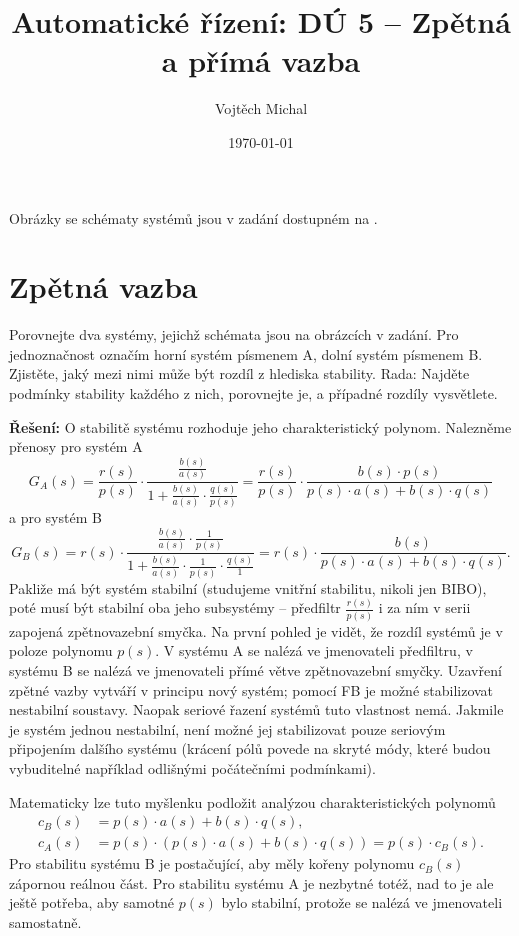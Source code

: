\documentclass[twoside]{article}
\title{Automatické řízení: DÚ 5 -- Zpětná a přímá vazba}
\author{Vojtěch Michal}
\date{\today}
\begin{document}
\maketitle

Obrázky se schématy systémů jsou v zadání dostupném na \cite{zadani}.

\section{Zpětná vazba}
Porovnejte dva systémy, jejichž schémata jsou na obrázcích v zadání.
Pro jednoznačnost označím horní systém písmenem A, dolní systém písmenem B.
Zjistěte, jaký mezi nimi může být rozdíl z hlediska stability. Rada: Najděte podmínky stability každého
z nich, porovnejte je, a případné rozdíly vysvětlete.

\textbf{Řešení:}
O stabilitě systému rozhoduje jeho charakteristický polynom. Nalezněme přenosy pro systém A
\begin{equation}
	G_A(s) = \frac{r(s)}{p(s)} \cdot \frac{\frac{b(s)}{a(s)} }{1 + \frac{b(s)}{a(s)} \cdot \frac{q(s)}{p(s)}} =
	\frac{r(s)}{p(s)} \cdot \frac{b(s) \cdot p(s)}{p(s) \cdot a(s) + b(s) \cdot q(s)}
\end{equation}
a pro systém B
\begin{equation}
	G_B(s) = r(s) \cdot \frac{\frac{b(s)}{a(s)} \cdot \frac{1}{p(s)}}{1 + \frac{b(s)}{a(s)} \cdot \frac{1}{p(s)} \cdot \frac{q(s)}{1}} =
	r(s) \cdot \frac{b(s) }{p(s) \cdot a(s) + b(s) \cdot q(s)}.
\end{equation}
Pakliže má být systém stabilní (studujeme vnitřní stabilitu, nikoli jen BIBO), poté musí být stabilní oba jeho subsystémy -- předfiltr
$\frac{r(s)}{p(s)}$ i za ním v serii zapojená zpětnovazební smyčka. Na první pohled je vidět, že rozdíl systémů je v poloze
polynomu $p(s)$. V systému A se nalézá ve jmenovateli předfiltru, v systému B se nalézá ve jmenovateli přímé větve zpětnovazební
smyčky. Uzavření zpětné vazby vytváří v principu nový systém; pomocí FB je možné stabilizovat nestabilní soustavy.
Naopak seriové řazení systémů tuto vlastnost nemá. Jakmile je systém jednou nestabilní, není možné jej stabilizovat pouze 
seriovým připojením dalšího systému (krácení pólů povede na skryté módy, které budou vybuditelné například odlišnými
počátečními podmínkami).

Matematicky lze tuto myšlenku podložit analýzou charakteristických polynomů
\begin{equation}
	\begin{split}
		c_B(s) &= p(s) \cdot a(s) + b(s) \cdot q(s), \\
		c_A(s) &= p(s) \cdot (p(s) \cdot a(s) + b(s) \cdot q(s)) = p(s) \cdot c_B(s).
	\end{split}
\end{equation}
Pro stabilitu systému B je postačující, aby měly kořeny polynomu $c_B(s)$ zápornou reálnou část.
Pro stabilitu systému A je nezbytné totéž, nad to je ale ještě potřeba, aby samotné $p(s)$ bylo stabilní,
protože se nalézá ve jmenovateli samostatně.
\end{document}
